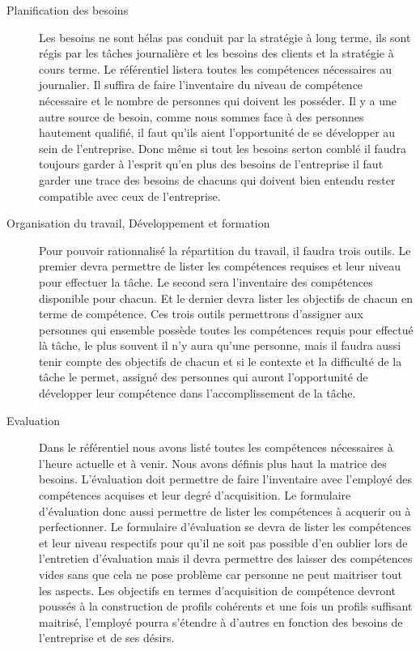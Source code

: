 \begin{description}
  \item[Planification des besoins] 
  Les besoins ne sont hélas pas conduit par la stratégie à long terme, ils sont régis par les tâches journalière et les besoins des clients et la stratégie à cours terme. Le référentiel listera toutes les compétences nécessaires au journalier. Il suffira de faire l'inventaire du niveau de compétence nécessaire et le nombre de personnes qui doivent les posséder. Il y a une autre source de besoin, comme nous sommes face à des personnes hautement qualifié, il faut qu'ils aient l'opportunité de se développer au sein de l'entreprise. Donc même si tout les besoins serton comblé il faudra toujours garder à l'esprit qu'en plus des besoins de l'entreprise il faut garder une trace des besoins de chacuns qui doivent bien entendu rester compatible avec ceux de l'entreprise. 

  \item[Organisation du travail, Développement et formation]
  Pour pouvoir rationnalisé la répartition du travail, il faudra trois outils. Le premier devra permettre de lister les compétences requises et leur niveau pour effectuer la tâche. Le second sera l'inventaire des compétences disponible pour chacun. Et le dernier devra lister les objectifs de chacun en terme de compétence. Ces trois outils permettrons d'assigner aux personnes qui ensemble possède toutes les compétences requis pour effectué là tâche, le plus souvent il n'y aura qu'une personne, mais il faudra aussi tenir compte des objectifs de chacun et si le contexte et la difficulté de la tâche le permet, assigné des personnes qui auront l'opportunité de développer leur compétence dans l'accomplissement de la tâche. %
  
  \item[Evaluation]
  Dans le référentiel nous avons listé toutes les compétences nécessaires à l'heure actuelle et à venir. Nous avons définis plus haut la matrice des besoins. L'évaluation doit permettre de faire l'inventaire avec l'employé des compétences acquises et leur degré d'acquisition. Le formulaire d'évaluation donc aussi permettre de lister les compétences à acquerir ou à perfectionner. Le formulaire d'évaluation se devra de lister les compétences et leur niveau respectifs pour qu'il ne soit pas possible d'en oublier lors de l'entretien d'évaluation mais il devra permettre des laisser des compétences vides sans que cela ne pose problème car personne ne peut maitriser tout les aspects. Les objectifs en termes d'acquisition de compétence devront poussés à la construction de profils cohérents et une fois un profils suffisant maitrisé, l'employé pourra s'étendre à d'autres en fonction des besoins de l'entreprise et de ses désirs. 
  

\end{description}
